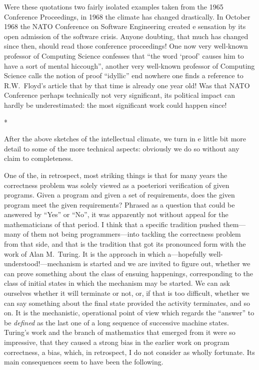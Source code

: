 \documentclass[10pt,letterpaper,twocolumn]{article}
\newcommand{\acro}[1]{{\small\MakeUppercase{#1}\spacefactor1000}}
\newcommand{\stardiv}{\medskip\centerline{*\quad*\quad*}\medskip\noindent\ignorespaces}
\begin{document}
Were these quotations two fairly isolated examples taken from the 1965
Conference Proceedings, in 1968 the climate has changed drastically. In October
1968 the \acro{NATO} Conference on Software Engineering created e sensation by
its open admission of the software crisis. Anyone doubting, that much has
changed since then, should read those conference proceedings! One now very
well-known professor of Computing Science confesses that ``the word `proof'
causes him to have a sort of mental hiccough'', another very well-known
professor of Computing Science calls the notion of proof ``idyllic'' end
nowhere one finds a reference to R.W.~Floyd's article that by that time is
already one year old! Was that \acro{NATO} Conference perhaps technically not
very significant, its political impact can hardly be underestimated: the most
significant work could happen since! 

\stardiv

After the above sketches of the intellectual climate, we turn in e little bit more detail 
to some of the more technical aspects: obviously 
we do so without any claim to completeness. 

One of the, in retrospect, most striking things is that for many years the
correctness problem was solely viewed as a poeteriori verification of given
programs. Given a program and given a set of requirements, does the given
program meet the given requirements? Phrased as a question that could be
answered by ``Yes'' or ``No'', it was apparently not without appeal for the
mathematicians of that period. I think that a specific tradition pushed
them---many of them not being programmers---into tackling the correctness
problem from that side, and that is the tradition that got its pronounced form
with the work of Alan M.~Turing. It is the approach in which a---hopefully
well-understood!---mechanism is started and we are invited to figure out,
whether we can prove something about the class of ensuing happenings,
corresponding to the class of initial states in which the mechanism may be
started. We can ask ourselves whether it will terminate or not, or, if that is
too difficult, whether we can say something about the final state provided the
activity terminates, and so on. It is the mechanistic, operational point of
view which regards the ``answer'' to be \emph{defined} as the last one of a
long sequence of successive machine states. Turing's work and the branch of
mathematics that emerged from it were so impressive, that they caused a strong
bias in the earlier work on program correctness, a bias, which, in retrospect,
I do not consider as wholly fortunate. Its main consequences seem to have been
the following. 
\end{document}
